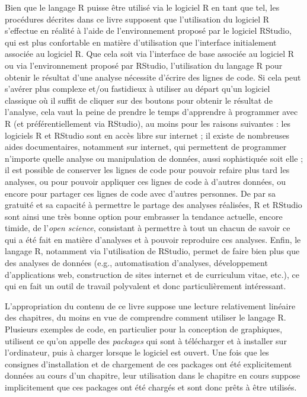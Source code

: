 \documentclass[
]{book}
\begin{document}
Bien que le langage R puisse être utilisé via le logiciel R en tant que tel, les procédures décrites dans ce livre supposent que l'utilisation du logiciel R s'effectue en réalité à l'aide de l'environnement proposé par le logiciel RStudio, qui est plus confortable en matière d'utilisation que l'interface initialement associée au logiciel R. Que cela soit via l'interface de base associée au logiciel R ou via l'environnement proposé par RStudio, l'utilisation du langage R pour obtenir le résultat d'une analyse nécessite d'écrire des lignes de code. Si cela peut s'avérer plus complexe et/ou fastidieux à utiliser au départ qu'un logiciel classique où il suffit de cliquer sur des boutons pour obtenir le résultat de l'analyse, cela vaut la peine de prendre le temps d'apprendre à programmer avec R (et préférentiellement via RStudio), au moins pour les raisons suivantes : les logiciels R et RStudio sont en accès libre sur internet ; il existe de nombreuses aides documentaires, notamment sur internet, qui permettent de programmer n'importe quelle analyse ou manipulation de données, aussi sophistiquée soit elle ; il est possible de conserver les lignes de code pour pouvoir refaire plus tard les analyses, ou pour pouvoir appliquer ces lignes de code à d'autres données, ou encore pour partager ces lignes de code avec d'autres personnes. De par sa gratuité et sa capacité à permettre le partage des analyses réalisées, R et RStudio sont ainsi une très bonne option pour embrasser la tendance actuelle, encore timide, de l'\emph{open science}, consistant à permettre à tout un chacun de savoir ce qui a été fait en matière d'analyses et à pouvoir reproduire ces analyses. Enfin, le langage R, notamment via l'utilisation de RStudio, permet de faire bien plus que des analyses de données (e.g., automatisation d'analyses, développement d'applications web, construction de sites internet et de curriculum vitae, etc.), ce qui en fait un outil de travail polyvalent et donc particulièrement intéressant.

L'appropriation du contenu de ce livre suppose une lecture relativement linéaire des chapitres, du moins en vue de comprendre comment utiliser le langage R. Plusieurs exemples de code, en particulier pour la conception de graphiques, utilisent ce qu'on appelle des \emph{packages} qui sont à télécharger et à installer sur l'ordinateur, puis à charger lorsque le logiciel est ouvert. Une fois que les consignes d'installation et de chargement de ces packages ont été explicitement données au cours d'un chapitre, leur utilisation dans le chapitre en cours suppose implicitement que ces packages ont été chargés et sont donc prêts à être utilisés.
\end{document}
